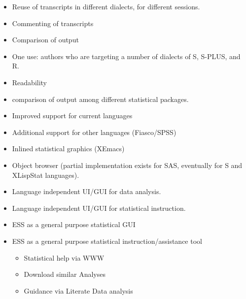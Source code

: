 \documentclass[semhelv]{seminar}
\begin{document}
\begin{slide}

  \begin{itemize}
  \item Reuse of transcripts in different dialects, for different
    sessions. 
  \item Commenting of transcripts
  \item Comparison of output
  \end{itemize}
\end{slide}

\begin{itemize}
\item One use: authors who are targeting a number of dialects of S,
  S-PLUS, and R.
\item Readability
\item comparison of output among different statistical packages.
\end{itemize}

  




\begin{slide}

  \begin{itemize}
  \item Improved support for current languages
  \item Additional support for other languages (Fiasco/SPSS)
  \item Inlined statistical graphics (XEmacs)
  \item Object browser (partial implementation exists for SAS,
    eventually for S and XLispStat languages).
  \item Language independent UI/GUI for data analysis.
  \item Language independent UI/GUI for statistical instruction.
  \end{itemize}
\end{slide}

\begin{itemize}
\item ESS as a general purpose statistical GUI
\item ESS as a general purpose statistical instruction/assistance tool 
  \begin{itemize}
  \item Statistical help via WWW
  \item Download similar Analyses
  \item Guidance via Literate Data analysis
  \end{itemize}
\end{itemize}
\end{document}
